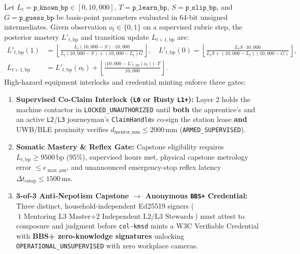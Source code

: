 \begin{definition}
\label{def:kappa-bkt}
Let $L_t = \mathtt{p\_known\_bp} \in [0, 10{,}000]$, $T = \mathtt{p\_learn\_bp}$,
$S = \mathtt{p\_slip\_bp}$, and $G = \mathtt{p\_guess\_bp}$ be basis-point parameters
evaluated in 64-bit unsigned intermediates. Given observation $o_t \in \{0, 1\}$ on a
supervised rubric step, the posterior mastery $L'_{t,\mathrm{bp}}$ and transition update
$L_{t+1,\mathrm{bp}}$ are:
\begin{align}
    L'_{t,\mathrm{bp}}(1) &= \left\lfloor \frac{L_t (10{,}000 - S) \cdot 10{,}000}{L_t (10{,}000 - S) + (10{,}000 - L_t) G} \right\rfloor, \quad
    L'_{t,\mathrm{bp}}(0) = \left\lfloor \frac{L_t S \cdot 10{,}000}{L_t S + (10{,}000 - L_t)(10{,}000 - G)} \right\rfloor, \label{eq:kappa-bkt-post}\\
    L_{t+1,\mathrm{bp}} &= L'_{t,\mathrm{bp}}(o_t) + \left\lfloor \frac{\big(10{,}000 - L'_{t,\mathrm{bp}}(o_t)\big) \cdot T}{10{,}000} \right\rfloor. \label{eq:kappa-bkt-step}
\end{align}
High-hazard equipment interlocks and credential minting enforce three gates:
\begin{enumerate}
    \item \textbf{Supervised Co-Claim Interlock (\texttt{L0} or Rusty \texttt{L1+}):} Layer 2
    holds the machine contactor in \texttt{LOCKED\_UNAUTHORIZED} until \textbf{both} the
    apprentice's and an active \texttt{L2}/\texttt{L3} journeyman's \texttt{ClaimHandle}s
    co-sign the station lease \textbf{and} UWB/BLE proximity verifies
    $d_{\mathrm{mentor\_mm}} \le 2000\,\mathrm{mm}$ (\texttt{ARMED\_SUPERVISED}).
    \item \textbf{Somatic Mastery \& Reflex Gate:} Capstone eligibility requires
    $L_{t,\mathrm{bp}} \ge 9500\,\mathrm{bp}$ ($95\%$), supervised hours met, physical
    capstone metrology error $\le \epsilon_{\max\,\mu\mathrm{m}}$, and unannounced
    emergency-stop reflex latency $\Delta t_{\mathrm{estop}} \le 1500\,\mathrm{ms}$.
    \item \textbf{3-of-3 Anti-Nepotism Capstone $\to$ Anonymous \texttt{BBS+} Credential:}
    Three distinct, household-independent Ed25519 signers ($\text{1 Mentoring L3 Master} +
    \text{2 Independent L2/L3 Stewards}$) must attest to composure and judgment before
    \texttt{col-kmsd} mints a W3C Verifiable Credential with \textbf{BBS+ zero-knowledge
    signatures} \parencite{camenisch2004signature,w3c2022vc} unlocking
    \texttt{OPERATIONAL\_UNSUPERVISED} with zero workplace cameras.
\end{enumerate}
\end{definition}

